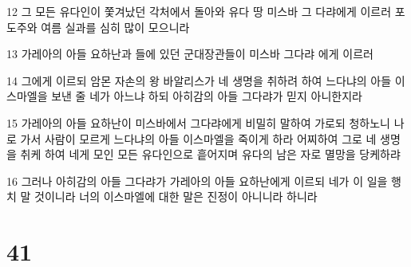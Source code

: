 \par 12 그 모든 유다인이 쫓겨났던 각처에서 돌아와 유다 땅 미스바 그 다랴에게 이르러 포도주와 여름 실과를 심히 많이 모으니라
\par 13 가레아의 아들 요하난과 들에 있던 군대장관들이 미스바 그다랴 에게 이르러
\par 14 그에게 이르되 암몬 자손의 왕 바알리스가 네 생명을 취하려 하여 느다냐의 아들 이스마엘을 보낸 줄 네가 아느냐 하되 아히감의 아들 그다랴가 믿지 아니한지라
\par 15 가레아의 아들 요하난이 미스바에서 그다랴에게 비밀히 말하여 가로되 청하노니 나로 가서 사람이 모르게 느다냐의 아들 이스마엘을 죽이게 하라 어찌하여 그로 네 생명을 취케 하여 네게 모인 모든 유다인으로 흩어지며 유다의 남은 자로 멸망을 당케하랴
\par 16 그러나 아히감의 아들 그다랴가 가레아의 아들 요하난에게 이르되 네가 이 일을 행치 말 것이니라 너의 이스마엘에 대한 말은 진정이 아니니라 하니라

\chapter{41}

